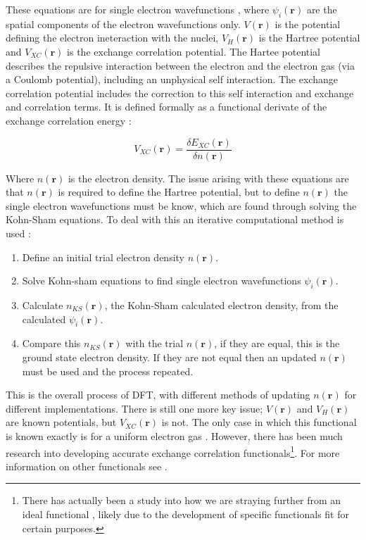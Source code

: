 \documentclass[a4paper,12pt]{article}
\begin{document}
These equations are for single electron wavefunctions , where $\psi _i (\textbf{r})$ are the spatial components of the electron wavefunctions only. $V(\textbf{r})$ is the potential defining the electron ineteraction with the nuclei, $V_H (\textbf{r})$ is the Hartree potential and $V_{XC} (\textbf{r})$ is the exchange correlation potential. The Hartee potential describes the repulsive interaction between the electron and the electron gas (via a Coulomb potential), including an unphysical self interaction. The exchange correlation potential includes the correction to this self interaction and exchange and correlation terms. It is defined formally as a functional derivate of the exchange correlation energy \cite{DFTintro}:

\bigskip
\begin{equation}
V_{XC}(\textbf{r}) = \frac{\delta E_{XC}(\textbf{r})}{\delta n(\textbf{r})}
\end{equation}
\bigskip

Where $n(\textbf{r})$ is the electron density. The issue arising with these equations are that $n(\textbf{r})$ is required to define the Hartree potential, but to define $n(\textbf{r})$ the single electron wavefunctions must be know, which are found through solving the Kohn-Sham equations. To deal with this an iterative computational method is used \cite{DFTintro}:

\bigskip
\begin{enumerate}
\item Define an initial trial electron density $n(\textbf{r})$.

\item Solve Kohn-sham equations to find single electron wavefunctions $\psi _i (\textbf{r})$.

\item Calculate $n_{KS}(\textbf{r})$, the Kohn-Sham calculated electron density, from the calculated $\psi _i (\textbf{r})$.

\item Compare this $n_{KS}(\textbf{r})$ with the trial $n(\textbf{r})$, if they are equal, this is the ground state electron density. If they are not equal then an updated $n(\textbf{r})$ must be used and the process repeated.
\end{enumerate}
\bigskip

This is the overall process of DFT, with different methods of updating $n(\textbf{r})$ for different implementations. There is still one more key issue; $V(\textbf{r})$ and $V_H (\textbf{r})$ are known potentials, but $V_{XC} (\textbf{r})$ is not. The only case in which this functional is known exactly is for a uniform electron gas \cite{Constantin, PerdewJohnWang}. However, there has been much research into developing accurate exchange correlation functionals\footnote{There has actually been a study into how we are straying further from an ideal functional \cite{Medvedev49}, likely due to the development of specific functionals fit for certain purposes.}. For more information on other functionals see \cite{DFTintro, DFTA}.
\end{document}
